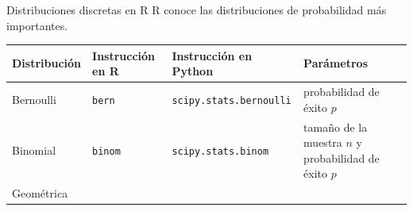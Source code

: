 \documentclass[
  ignorenonframetext,
]{beamer}
\begin{document}
\begin{frame}[fragile]{Distribuciones discretas en R}
\protect\hypertarget{distribuciones-discretas-en-r}{}
R conoce las distribuciones de probabilidad más importantes.

\begin{longtable}[]{@{}llll@{}}
\toprule
\begin{minipage}[b]{0.22\columnwidth}\raggedright
Distribución\strut
\end{minipage} & \begin{minipage}[b]{0.22\columnwidth}\raggedright
Instrucción en R\strut
\end{minipage} & \begin{minipage}[b]{0.22\columnwidth}\raggedright
Instrucción en Python\strut
\end{minipage} & \begin{minipage}[b]{0.22\columnwidth}\raggedright
Parámetros\strut
\end{minipage}\tabularnewline
\midrule
\endhead
\begin{minipage}[t]{0.22\columnwidth}\raggedright
Bernoulli\strut
\end{minipage} & \begin{minipage}[t]{0.22\columnwidth}\raggedright
\texttt{bern}\strut
\end{minipage} & \begin{minipage}[t]{0.22\columnwidth}\raggedright
\texttt{scipy.stats.bernoulli}\strut
\end{minipage} & \begin{minipage}[t]{0.22\columnwidth}\raggedright
probabilidad de éxito \(p\)\strut
\end{minipage}\tabularnewline
\begin{minipage}[t]{0.22\columnwidth}\raggedright
Binomial\strut
\end{minipage} & \begin{minipage}[t]{0.22\columnwidth}\raggedright
\texttt{binom}\strut
\end{minipage} & \begin{minipage}[t]{0.22\columnwidth}\raggedright
\texttt{scipy.stats.binom}\strut
\end{minipage} & \begin{minipage}[t]{0.22\columnwidth}\raggedright
tamaño de la muestra \(n\) y probabilidad de éxito \(p\)\strut
\end{minipage}\tabularnewline
\begin{minipage}[t]{0.22\columnwidth}\raggedright
Geométrica\strut
\end{minipage} & \begin{minipage}[t]{0.22\columnwidth}\raggedright

\end{minipage}
\end{longtable}
\end{frame}
\end{document}
